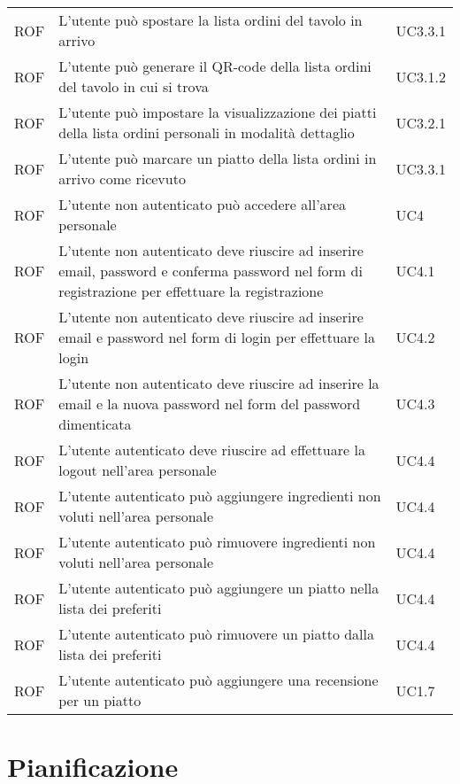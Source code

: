\begin{center}
\begin{longtable}{ |p{1.5cm}|p{9cm}|p{1.5cm}|  }
        ROF&L'utente può spostare la lista ordini del tavolo in arrivo &UC3.3.1 \\
        ROF&L'utente può generare il QR-code della lista ordini del tavolo in cui si trova &UC3.1.2 \\
        ROF&L'utente può impostare la visualizzazione dei piatti della lista ordini personali in modalità dettaglio&UC3.2.1 \\
        ROF&L'utente può marcare un piatto della lista ordini in arrivo come ricevuto&UC3.3.1 \\
        ROF&L'utente non autenticato può accedere all'area personale&UC4\\
        ROF&L'utente non autenticato deve riuscire ad inserire email, password e conferma password nel form di registrazione per effettuare la registrazione &UC4.1\\
        ROF&L'utente non autenticato deve riuscire ad inserire email e password nel form di login per effettuare la login &UC4.2\\
        ROF&L'utente non autenticato deve riuscire ad inserire la email e la nuova password nel form del password dimenticata&UC4.3\\
        ROF&L'utente autenticato deve riuscire ad effettuare la logout nell'area personale&UC4.4\\
        ROF&L'utente autenticato può aggiungere ingredienti non voluti nell'area personale&UC4.4\\
        ROF&L'utente autenticato può rimuovere ingredienti non voluti nell'area personale&UC4.4\\
        ROF&L'utente autenticato può aggiungere un piatto nella lista dei preferiti&UC4.4\\
        ROF&L'utente autenticato può rimuovere un piatto dalla lista dei preferiti&UC4.4\\
        ROF&L'utente autenticato può aggiungere una recensione per un piatto&UC1.7\\
       
\hline
\end{longtable}
\end{center}


\section{Pianificazione}